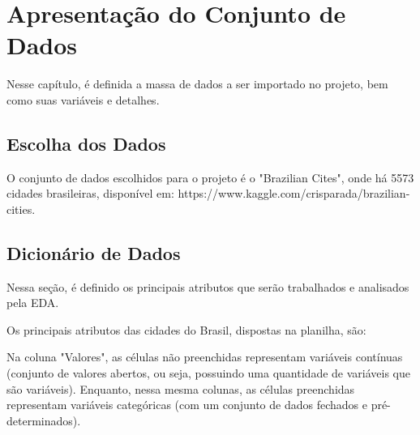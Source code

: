 \chapter{Apresentação do Conjunto de Dados}	

Nesse capítulo, é definida a massa de dados a ser importado no projeto, bem como suas variáveis e detalhes.

\section{Escolha dos Dados}

O conjunto de dados escolhidos para o projeto é o "Brazilian Cites", onde há 5573 cidades brasileiras, disponível em: https://www.kaggle.com/crisparada/brazilian-cities.

\section{Dicionário de Dados}

Nessa seção, é definido os principais atributos que serão trabalhados e analisados pela EDA. 

Os principais atributos das cidades do Brasil, dispostas na planilha, são:



Na coluna "Valores", as células não preenchidas representam variáveis contínuas (conjunto de valores abertos, ou seja, possuindo uma quantidade de variáveis que são variáveis). Enquanto, nessa mesma colunas, as células preenchidas representam variáveis categóricas (com um conjunto de dados fechados e pré-determinados).

